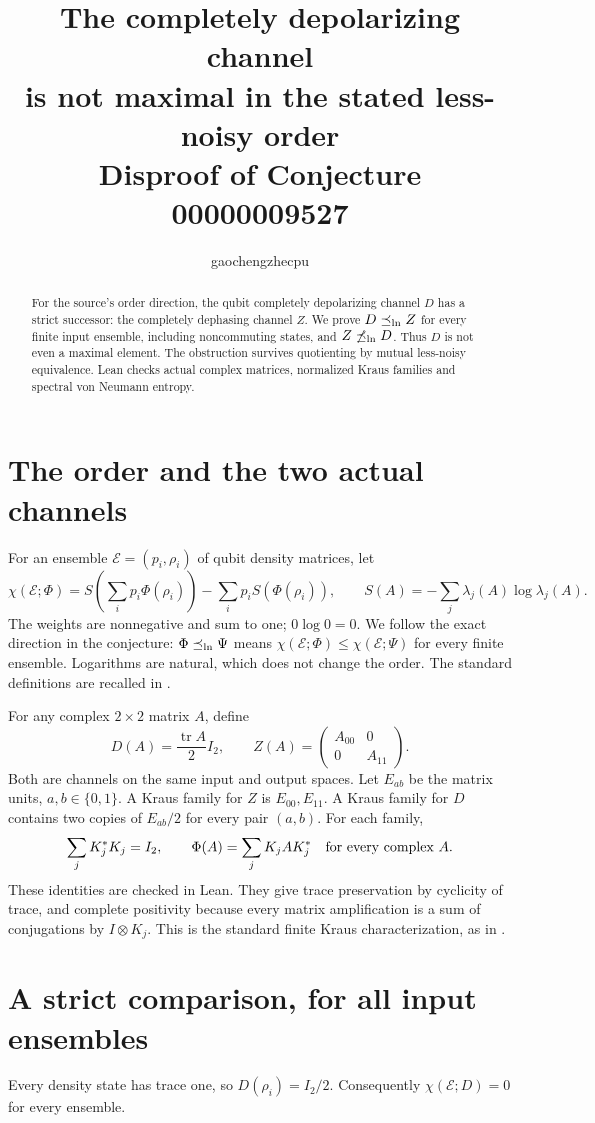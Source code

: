 \documentclass[11pt]{article}
\title{The completely depolarizing channel\\is not maximal in the stated less-noisy order\\
\large Disproof of Conjecture 00000009527}
\author{gaochengzhecpu}\date{}
\newcommand{\tr}{\operatorname{tr}}
\begin{document}
\maketitle
\begin{abstract}
For the source's order direction, the qubit completely
depolarizing channel $D$ has a strict successor: the completely
dephasing channel $Z$. We prove $D\preceq_{\rm ln}Z$ for
every finite input ensemble, including noncommuting states,
and $Z\not\preceq_{\rm ln}D$. Thus $D$ is not even a maximal
element. The obstruction survives quotienting by mutual
less-noisy equivalence. Lean checks actual complex matrices,
normalized Kraus families and spectral von Neumann entropy.
\end{abstract}

\section*{The order and the two actual channels}
For an ensemble $\mathcal E=(p_i,\rho_i)$ of qubit density
matrices, let
\[
 \chi(\mathcal E;\Phi)=
 S\left(\sum_i p_i\Phi(\rho_i)\right)
 -\sum_i p_iS(\Phi(\rho_i)),\qquad
 S(A)=-\sum_j\lambda_j(A)\log\lambda_j(A).
\]
The weights are nonnegative and sum to one; $0\log0=0$.
We follow the exact direction in the conjecture:
$\Phi\preceq_{\rm ln}\Psi$ means
$\chi(\mathcal E;\Phi)\leq\chi(\mathcal E;\Psi)$ for every
finite ensemble. Logarithms are natural, which does not
change the order. The standard definitions are recalled in
\cite[Sections 5.2 and 5.3.3]{watrous}.

For any complex $2\times2$ matrix $A$, define
\[
 D(A)=\frac{\tr A}{2}I_2,\qquad
 Z(A)=\begin{pmatrix}A_{00}&0\\0&A_{11}\end{pmatrix}.
\]
Both are channels on the same input and output spaces. Let
$E_{ab}$ be the matrix units, $a,b\in\{0,1\}$. A Kraus
family for $Z$ is $E_{00},E_{11}$. A Kraus family for $D$
contains two copies of $E_{ab}/2$ for every pair $(a,b)$.
For each family,
\[
 \sum_j K_j^*K_j=I_2,\qquad
 \Phi(A)=\sum_jK_jAK_j^*\quad\hbox{for every complex }A.
\]
These identities are checked in Lean. They give trace
preservation by cyclicity of trace, and complete positivity
because every matrix amplification is a sum of conjugations
by $I\otimes K_j$. This is the standard finite Kraus
characterization, as in \cite[Section 2.2]{watrous}.

\newpage
\section*{A strict comparison, for all input ensembles}
Every density state has trace one, so $D(\rho_i)=I_2/2$.
Consequently $\chi(\mathcal E;D)=0$ for every ensemble.
\end{document}
